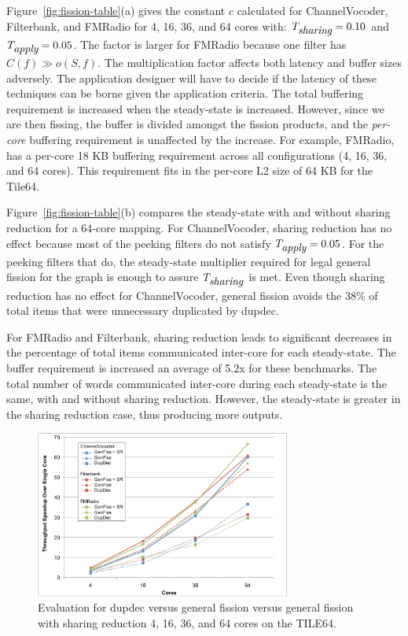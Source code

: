 Figure~\ref{fig:fission-table}(a) gives the constant $c$
calculated for ChannelVocoder, Filterbank, and FMRadio for 4, 16, 36,
and 64 cores with: $T_{\mbox{\it sharing}} = 0.10$ and $T_{\mbox{\it apply}} =
0.05$.  The factor is larger for FMRadio because one filter
has $C(f) \gg o(S, f)$.  The multiplication factor affects both
latency and buffer sizes adversely.  The application designer will
have to decide if the latency of these techniques can be borne given
the application criteria.  The total buffering requirement is
increased when the steady-state is increased.  However, since we are
then fissing, the buffer is divided amongst the fission products, and
the {\it per-core} buffering requirement is unaffected by the
increase.  For example, FMRadio, has a per-core 18 KB buffering
requirement across all configurations (4, 16, 36, and 64 cores).  This
requirement fits in the per-core L2 size of 64 KB for the Tile64.

Figure~\ref{fig:fission-table}(b) compares the steady-state with and
without sharing reduction for a 64-core mapping.  For ChannelVocoder,
sharing reduction has no effect because most of the peeking filters do
not satisfy $T_{\mbox{\it apply}} = 0.05$.  For the peeking filters that do,
the steady-state multiplier required for legal general fission for the
graph is enough to assure $T_{\mbox{\it sharing}}$ is met.  Even though
sharing reduction has no effect for ChannelVocoder, general fission
avoids the 38\% of total items that were unnecessary duplicated by
dupdec.

For FMRadio and Filterbank, sharing reduction leads to significant
decreases in the percentage of total items communicated inter-core for
each steady-state.  The buffer requirement is increased an average of
5.2x for these benchmarks.  The total number of words communicated
inter-core during each steady-state is the same, with and without
sharing reduction.  However, the steady-state is greater in the
sharing reduction case, thus producing more outputs.

\begin{figure}[t]
\centering
\includegraphics[width=3.3in]{figures/tilera-chart.pdf}
\caption[Comparing the fission techniques on the TILE64.]{
  Evaluation for dupdec versus general fission versus general fission with sharing reduction
  4, 16, 36, and 64 cores on the TILE64.  \label{fig:tilera-chart}}
\end{figure}

